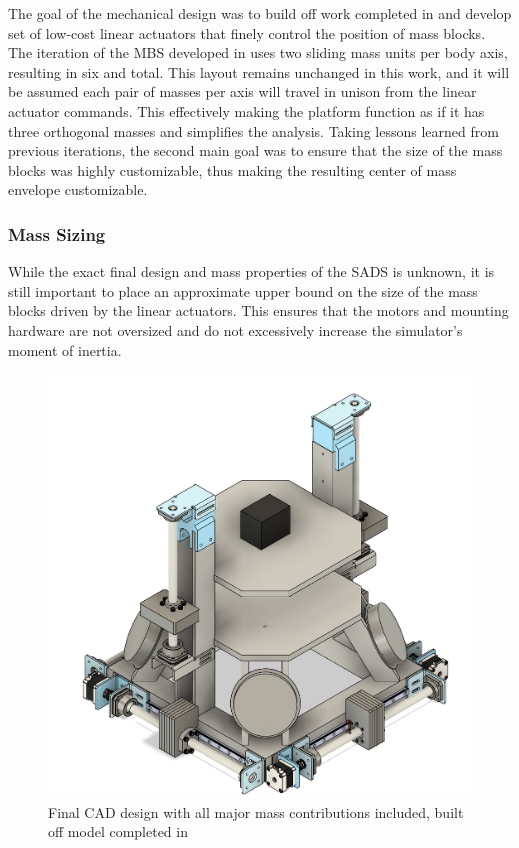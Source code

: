 The goal of the mechanical design was to build off work completed in \cite{gilman_automatic_2024} and develop set of low-cost linear actuators that finely control the position of mass blocks. The iteration of the MBS developed in \cite{gilman_automatic_2024} uses two sliding mass units per body axis, resulting in six and total. This layout remains unchanged in this work, and it will be assumed each pair of masses per axis will travel in unison from the linear actuator commands. This effectively making the platform function as if it has three orthogonal masses and simplifies the analysis. Taking lessons learned from previous iterations, the second main goal was to ensure that the size of the mass blocks was highly customizable, thus making the resulting center of mass envelope customizable. 

\subsubsection{Mass Sizing}

While the exact final design and mass properties of the SADS is unknown, it is still important to place an approximate upper bound on the size of the mass blocks driven by the linear actuators. This ensures that the motors and mounting hardware are not oversized and do not excessively increase the simulator's moment of inertia.

\begin{figure}[h]\label{fig:full_CAD}
    \centering
    \includegraphics[width=0.95\linewidth]{figures/full_CAD.png}
    \caption{Final CAD design with all major mass contributions included, built off model completed in~\cite{gilman_automatic_2024}}
    \label{fig:final_CAD}
\end{figure}



